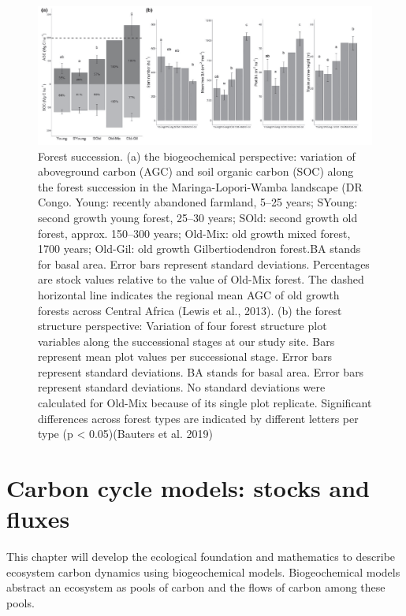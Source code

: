 \documentclass[12pt,oneside]{book}
\begin{document}
\begin{figure}

{\centering \includegraphics[width=0.8\linewidth]{figures/chap5/f51_bauters} 

}

\caption{Forest succession. (a) the biogeochemical perspective: variation of aboveground carbon (AGC) and soil organic carbon (SOC) along the forest succession in the Maringa-Lopori-Wamba landscape (DR Congo. Young: recently abandoned farmland, 5–25 years; SYoung: second growth young forest, 25–30 years; SOld: second growth old forest, approx. 150–300 years; Old-Mix: old growth mixed forest, 1700 years; Old-Gil: old growth Gilbertiodendron forest.BA stands for basal area. Error bars represent standard deviations. Percentages are stock values relative to the value of Old-Mix forest. The dashed horizontal line indicates the regional mean AGC of old growth forests across Central Africa (Lewis et al., 2013). (b) the forest structure perspective: Variation of four forest structure plot variables along the successional stages at our study site. Bars represent mean plot values per successional stage. Error bars represent standard deviations. BA stands for basal area. Error bars represent standard deviations. No standard deviations were calculated for Old-Mix because of its single plot replicate. Significant differences across forest types are indicated by different letters per type (p < 0.05)(Bauters et al. 2019)}\label{fig:f51}
\end{figure}

\section{Carbon cycle models: stocks and
fluxes}\label{carbon-cycle-models-stocks-and-fluxes}

This chapter will develop the ecological foundation and mathematics to
describe ecosystem carbon dynamics using biogeochemical models.
Biogeochemical models abstract an ecosystem as pools of carbon and the
flows of carbon among these pools.
\end{document}
